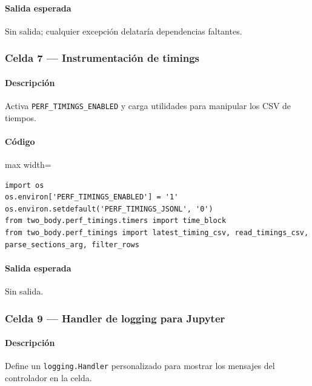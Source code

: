 \paragraph{Salida esperada} Sin salida; cualquier excepción delataría dependencias faltantes.

\subsubsection*{Celda 7 — Instrumentación de timings}
\paragraph{Descripción} Activa \texttt{PERF\_TIMINGS\_ENABLED} y carga utilidades para manipular los CSV de tiempos.
\paragraph{Código}
\par\smallskip
\begin{listing}[H]
\caption{Celda 7: configuración de \texttt{perf\_timings}}
\begin{adjustbox}{max width=\textwidth}
\begin{minipage}{\textwidth}
\begin{verbatim}
import os
os.environ['PERF_TIMINGS_ENABLED'] = '1'
os.environ.setdefault('PERF_TIMINGS_JSONL', '0')
from two_body.perf_timings.timers import time_block
from two_body.perf_timings import latest_timing_csv, read_timings_csv, parse_sections_arg, filter_rows
\end{verbatim}
\end{minipage}
\end{adjustbox}
\end{listing}
\paragraph{Salida esperada} Sin salida.

\subsubsection*{Celda 9 — Handler de logging para Jupyter}
\paragraph{Descripción} Define un \texttt{logging.Handler} personalizado para mostrar los mensajes del controlador en la celda.

